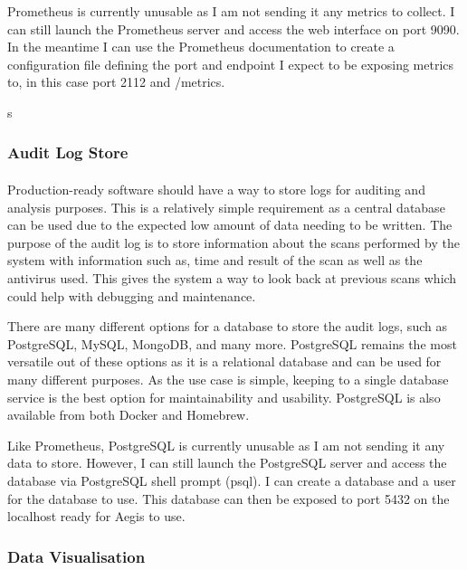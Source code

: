 \documentclass[12pt, conference, final, a4paper, onecolumn, compsoc]{IEEEtran}
\begin{document}
Prometheus is currently unusable as I am not sending it any metrics to collect.
I can still launch the Prometheus server and access the web interface on port
9090. In the meantime I can use the Prometheus documentation to create a
configuration file defining the port and endpoint I expect to be exposing
metrics to, in this case port 2112 and /metrics.

s

\subsubsection*{Audit Log Store}
\paragraph{}

Production-ready software should have a way to store logs for auditing and
analysis purposes. This is a relatively simple requirement as a central database
can be used due to the expected low amount of data needing to be written. The
purpose of the audit log is to store information about the scans performed by
the system with information such as, time and result of the scan as well as the
antivirus used. This gives the system a way to look back at previous scans which
could help with debugging and maintenance.

There are many different options for a database to store the audit logs, such as
PostgreSQL, MySQL, MongoDB, and many more. PostgreSQL remains the most versatile
out of these options as it is a relational database and can be used for many
different purposes. As the use case is simple, keeping to a single database
service is the best option for maintainability and usability. PostgreSQL is also
available from both Docker and Homebrew.


Like Prometheus, PostgreSQL is currently unusable as I am not sending it any
data to store. However, I can still launch the PostgreSQL server and access the
database via PostgreSQL shell prompt (psql). I can create a database and a user
for the database to use. This database can then be exposed to port 5432 on the
localhost ready for Aegis to use.


\subsubsection*{Data Visualisation}
\end{document}
